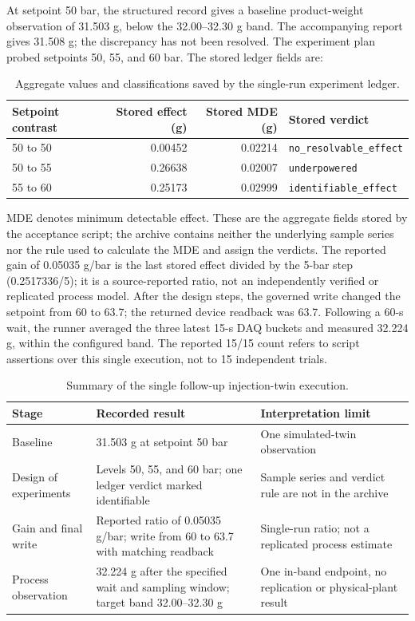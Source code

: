 \documentclass[10pt]{article}
\begin{document}
At setpoint 50 bar, the structured record gives a baseline product-weight
observation of 31.503 g, below the 32.00--32.30 g band. The accompanying
report gives 31.508 g; the discrepancy has not been resolved. The experiment plan probed setpoints 50, 55,
and 60 bar.
The stored ledger fields are:

\begin{table}[h]
\centering
\caption{Aggregate values and classifications saved by the single-run experiment ledger.}
\footnotesize
\begin{tabular}{@{}l r r l@{}}
\toprule
Setpoint contrast & Stored effect (g) & Stored MDE (g) & Stored verdict \\
\midrule
50 to 50 & 0.00452 & 0.02214 & \texttt{no\_resolvable\_effect} \\
50 to 55 & 0.26638 & 0.02007 & \texttt{underpowered} \\
55 to 60 & 0.25173 & 0.02999 & \texttt{identifiable\_effect} \\
\bottomrule
\end{tabular}
\end{table}

MDE denotes minimum detectable effect. These are the aggregate fields stored
by the acceptance script; the archive contains neither the underlying sample
series nor the rule used to calculate the MDE and assign the verdicts. The
reported gain of 0.05035 g/bar is the last stored effect divided by the
5-bar step (0.2517336/5); it is a source-reported ratio, not an independently
verified or replicated process model. After the design steps,
the governed write changed the setpoint from 60 to 63.7; the returned device
readback was 63.7. Following a 60-s wait, the runner averaged the three latest
15-s DAQ buckets and measured 32.224 g, within the configured band. The
reported 15/15 count refers to script assertions over this single execution,
not to 15 independent trials.

\begin{table}[h]
\centering
\caption{Summary of the single follow-up injection-twin execution.}
\footnotesize
\setlength{\tabcolsep}{4pt}
\begin{tabularx}{\textwidth}{@{}p{3.3cm}X p{4.8cm}@{}}
\toprule
Stage & Recorded result & Interpretation limit \\
\midrule
Baseline & 31.503 g at setpoint 50 bar & One simulated-twin observation \\
Design of experiments & Levels 50, 55, and 60 bar; one ledger verdict marked identifiable & Sample series and verdict rule are not in the archive \\
Gain and final write & Reported ratio of 0.05035 g/bar; write from 60 to 63.7 with matching readback & Single-run ratio; not a replicated process estimate \\
Process observation & 32.224 g after the specified wait and sampling window; target band 32.00--32.30 g & One in-band endpoint, no replication or physical-plant result \\
\bottomrule
\end{tabularx}
\end{table}
\end{document}
